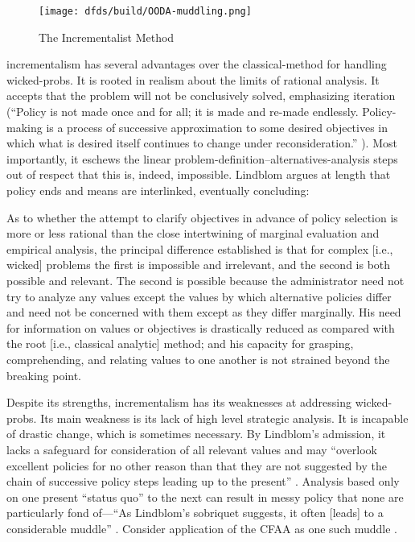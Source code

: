 \begin{figure}[h]
  \centering\CaptionFontSize
  \texttt{[image: dfds/build/OODA-muddling.png]}
  \caption[The Incrementalist Method]{The Incrementalist Method}
  \label{fig-muddling-through}
\end{figure}

\Ac{incrementalism} has several advantages over the \ac{classical-method} for handling \acp{wicked-prob}. It is rooted
in realism about the limits of rational analysis. It accepts that the problem will not be conclusively solved,
emphasizing iteration (``Policy is not made once and for all; it is made and re-made endlessly. Policy-making is a
process of successive approximation to some desired objectives in which what is desired itself continues to change under
reconsideration.'' \cite{lindblom_muddling_1959}). Most importantly, it eschews the linear
problem-definition--alternatives-analysis steps out of respect that this is, indeed, impossible. Lindblom argues at
length that policy ends and means are interlinked, eventually concluding:

\begin{displayquote}
As to whether the attempt to clarify objectives in advance of policy selection is more or less rational than the close
intertwining of marginal evaluation and empirical analysis, the principal difference established is that for complex
[i.e., wicked] problems the first is impossible and irrelevant, and the second is both possible and relevant. The second
is possible because the administrator need not try to analyze any values except the values by which alternative policies
differ and need not be concerned with them except as they differ marginally. His need for information on values or
objectives is drastically reduced as compared with the root [i.e., classical analytic] method; and his capacity for
grasping, comprehending, and relating values to one another is not strained beyond the breaking point.
\cite{lindblom_muddling_1959}
\end{displayquote}

Despite its strengths, \ac{incrementalism} has its weaknesses at addressing \acp{wicked-prob}. Its main weakness is its
lack of high level strategic analysis. It is incapable of drastic change, which is sometimes necessary. By Lindblom's
admission, it lacks a safeguard for consideration of all relevant values and may ``overlook excellent policies for no
other reason than that they are not suggested by the chain of successive policy steps leading up to the present''
\cite{lindblom_muddling_1959}. Analysis based only on one present ``status quo'' to the next can result in messy policy
that none are particularly fond of---``As Lindblom's sobriquet suggests, it often [leads] to a considerable muddle''
\cite{feeley_judicial_2000}. Consider application of the \acl{CFAA} as one such muddle \cite{wolff_computer_2016}.

